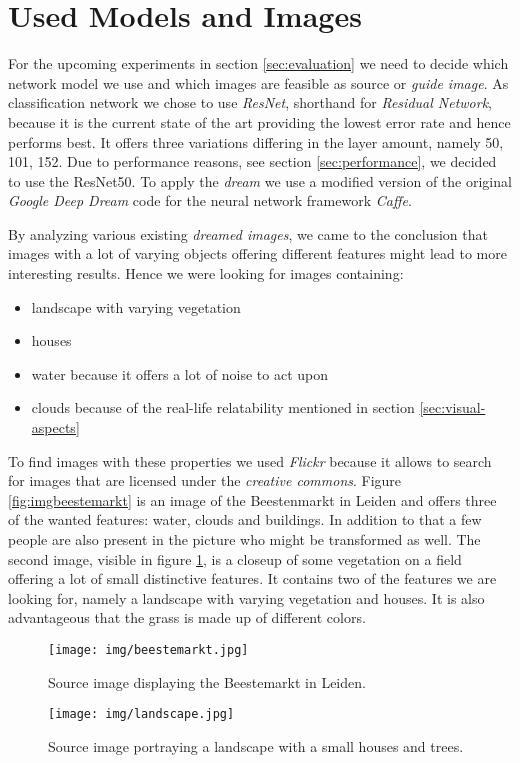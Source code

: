 \section{Used Models and Images}
\label{sec:data}
For the upcoming experiments in section \ref{sec:evaluation} we need to decide which network model we use and which images are feasible as source or \emph{guide image}.
As classification network we chose to use \emph{ResNet}\cite{he2016deep}, shorthand for \emph{Residual Network}, because it is the current state of the art providing the lowest error rate and hence performs best.\cite{cnnComparison}
It offers three variations differing in the layer amount, namely 50, 101, 152.
Due to performance reasons, see section \ref{sec:performance}, we decided to use the ResNet50.
To apply the \emph{dream} we use a modified version of the original \textit{Google Deep Dream} code\cite{deep-dream-github} for the neural network framework \textit{Caffe}\cite{jia2014caffe}.

By analyzing various existing \emph{dreamed images}, we came to the conclusion that images with a lot of varying objects offering different features might lead to more interesting results.
Hence we were looking for images containing: 
\begin{itemize}
	\item landscape with varying vegetation
	\item houses
	\item water because it offers a lot of noise to act upon
	\item clouds because of the real-life relatability mentioned in section \ref{sec:visual-aspects}
\end{itemize}

To find images with these properties we used \emph{Flickr} because it allows to search for images that are licensed under the \emph{creative commons}.
Figure \ref{fig:imgbeestemarkt} is an image of the Beestenmarkt in Leiden and offers three of the wanted features: water, clouds and buildings.
In addition to that a few people are also present in the picture who might be transformed as well.
The second image, visible in figure \ref{fig:imglandscape}, is a closeup of some vegetation on a field offering a lot of small distinctive features.
It contains two of the features we are looking for, namely a landscape with varying vegetation and houses.
It is also advantageous that the grass is made up of different colors.



\begin{figure}[H]
	\centering
	\texttt{[image: img/beestemarkt.jpg]}
	\caption{Source image displaying the Beestemarkt in Leiden\cite{imgbeestemarkt}.}
	\label{fig:imgbeestemarkt}
	\endminipage\hfill
	\centering
	\texttt{[image: img/landscape.jpg]}
	\caption{Source image portraying a landscape with a small houses and trees\cite{imglandscape}.}
	\label{fig:imglandscape}
	\endminipage\hfill
\end{figure}